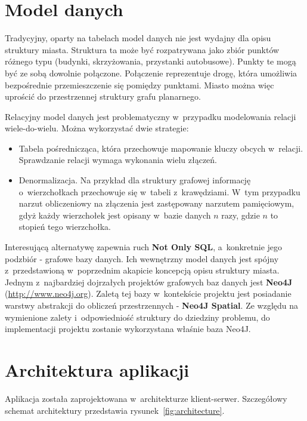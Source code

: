 \documentclass[a4paper,12pt]{article}
\begin{document}
	\section*{Model danych}

	Tradycyjny, oparty na tabelach model danych nie jest wydajny dla opisu struktury miasta. Struktura ta może być rozpatrywana jako zbiór punktów różnego typu (budynki, skrzyżowania, przystanki autobusowe). Punkty te mogą być ze sobą dowolnie połączone. Połączenie reprezentuje drogę, która umożliwia bezpośrednie przemieszczenie się pomiędzy punktami. Miasto można więc uprościć do przestrzennej struktury grafu planarnego.

	Relacyjny model danych jest problematyczny w~przypadku modelowania relacji wiele-do-wielu. Można wykorzystać dwie strategie:

	\begin{itemize}
		\item Tabela pośrednicząca, która przechowuje mapowanie kluczy obcych w~relacji. Sprawdzanie relacji wymaga wykonania wielu złączeń.
		\item Denormalizacja. Na przykład dla struktury grafowej informację o~wierzchołkach przechowuje się w~tabeli z~krawędziami. W~tym przypadku narzut obliczeniowy na złączenia jest zastępowany narzutem pamięciowym, gdyż każdy wierzchołek jest opisany w~bazie danych $n$ razy, gdzie $n$ to stopień tego wierzchołka.
	\end{itemize}

	Interesującą alternatywę zapewnia ruch \textbf{Not Only SQL}, a~konkretnie jego podzbiór - grafowe bazy danych. Ich wewnętrzny model danych jest spójny z~przedstawioną w~poprzednim akapicie koncepcją opisu struktury miasta. Jednym z~najbardziej dojrzałych projektów grafowych baz danych jest \textbf{Neo4J} (\url{http://www.neo4j.org}). Zaletą tej bazy w~kontekście projektu jest posiadanie warstwy abstrakcji do obliczeń przestrzennych - \textbf{Neo4J Spatial}. Ze względu na wymienione zalety i~odpowiedniość struktury do dziedziny problemu, do implementacji projektu zostanie wykorzystana właśnie baza Neo4J.

	\section*{Architektura aplikacji}

	Aplikacja została zaprojektowana w~architekturze klient-serwer. Szczegółowy schemat architektury przedstawia rysunek~\ref{fig:architecture}. 
\end{document}
